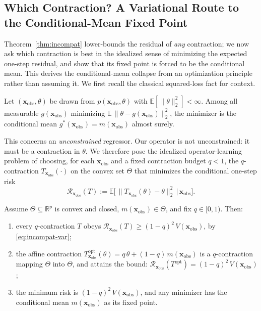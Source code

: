 \subsection{Which Contraction? A Variational Route to the Conditional-Mean Fixed Point}
\label{subsec:collapse}

Theorem~\ref{thm:incompat} lower-bounds the residual of \emph{any} contraction; we now ask which contraction is best in the idealized sense of minimizing the expected one-step residual, and show that its fixed point is forced to be the conditional mean. This derives the conditional-mean collapse from an optimization principle rather than assuming it. We first recall the classical squared-loss fact for context.

\begin{proposition}
\label{prop:optimal_predictor}
Let $(\mathbf{x}_\mathrm{obs}, \theta)$ be drawn from $p(\mathbf{x}_\mathrm{obs}, \theta)$ with $\mathbb{E}[\|\theta\|_2^2] < \infty$. Among all measurable $g(\mathbf{x}_\mathrm{obs})$ minimizing $\mathbb{E}\,\|\theta - g(\mathbf{x}_\mathrm{obs})\|_2^2$, the minimizer is the conditional mean $g^*(\mathbf{x}_\mathrm{obs}) = m(\mathbf{x}_\mathrm{obs})$ almost surely.
\end{proposition}

This concerns an \emph{unconstrained} regressor. Our operator is not unconstrained: it must be a contraction in $\theta$. We therefore pose the idealized operator-learning problem of choosing, for each $\mathbf{x}_\mathrm{obs}$ and a fixed contraction budget $q<1$, the $q$-contraction $T_{\mathbf{x}_\mathrm{obs}}(\cdot)$ on the convex set $\Theta$ that minimizes the conditional one-step risk
\begin{equation}
\label{eq:cond-onestep-risk}
\mathcal{R}_{\mathbf{x}_\mathrm{obs}}(T)
:=
\mathbb{E}\big[\,\|T_{\mathbf{x}_\mathrm{obs}}(\theta)-\theta\|_2^2 \,\big|\, \mathbf{x}_\mathrm{obs}\big].
\end{equation}

\begin{theorem}
\label{thm:variational}
Assume $\Theta\subseteq\mathbb{R}^p$ is convex and closed, $m(\mathbf{x}_\mathrm{obs})\in\Theta$, and fix $q\in[0,1)$. Then:
\begin{enumerate}
\item[(i)] every $q$-contraction $T$ obeys $\mathcal{R}_{\mathbf{x}_\mathrm{obs}}(T)\ge (1-q)^2\,V(\mathbf{x}_\mathrm{obs})$, by \eqref{eq:incompat-var};
\item[(ii)] the affine contraction $T^{\mathrm{opt}}_{\mathbf{x}_\mathrm{obs}}(\theta)=q\,\theta+(1-q)\,m(\mathbf{x}_\mathrm{obs})$ is a $q$-contraction mapping $\Theta$ into $\Theta$, and attains the bound: $\mathcal{R}_{\mathbf{x}_\mathrm{obs}}(T^{\mathrm{opt}})=(1-q)^2\,V(\mathbf{x}_\mathrm{obs})$;
\item[(iii)] the minimum risk is $(1-q)^2\,V(\mathbf{x}_\mathrm{obs})$, and any minimizer has the conditional mean $m(\mathbf{x}_\mathrm{obs})$ as its fixed point.
\end{enumerate}
\end{theorem}


